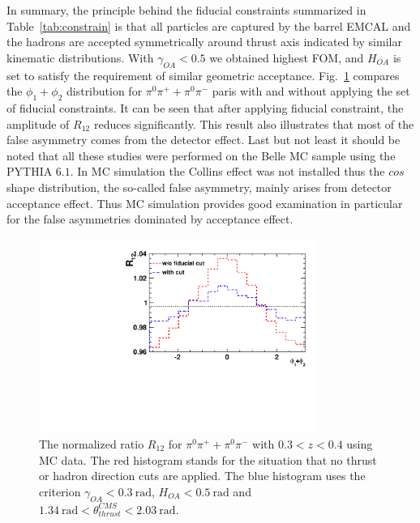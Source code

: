 In summary, the principle behind the fiducial constraints summarized in Table~\ref{tab:constrain} is that all particles are captured by the barrel EMCAL and the hadrons are accepted symmetrically around thrust axis indicated by similar kinematic distributions. With $\gamma_{OA}<0.5$ we obtained highest FOM, and $H_{OA}$ is set to satisfy the requirement of similar geometric acceptance. Fig.~\ref{fig:differentthetarange} compares the $\phi_1+\phi_2$ distribution for $\pi^0\pi^++\pi^0\pi^-$ paris with and without applying the set of fiducial constraints. It can be seen that after applying fiducial constraint, the amplitude of $R_{12}$ reduces significantly. This result also illustrates that  most of the false asymmetry comes from the detector effect. Last but not least it should be noted that all these studies were performed on the Belle MC sample using the PYTHIA $6.1$. In MC simulation the Collins effect was not installed thus the $cos$ shape distribution, the so-called false asymmetry, mainly arises from detector acceptance effect. Thus MC simulation provides good examination in particular for the false asymmetries dominated by acceptance effect.

\begin{figure}[h]
    \centering
    \includegraphics[width=0.8\textwidth,natwidth=610,natheight=642]{figure_dataselection/DetectorEffect.pdf}
    \caption{The normalized ratio $R_{12}$ for $\pi^0\pi^++\pi^0\pi^-$ with $0.3<z<0.4$ using MC data. The red histogram stands for the situation that no thrust or hadron direction cuts are applied. The blue histogram uses the criterion $\gamma_{OA} <0.3~\text{rad}$, $H_{OA}<0.5~\text{rad}$ and $1.34~\text{rad}<\theta^{CMS}_{thrust}<2.03~\text{rad}$.}
    \label{fig:differentthetarange}
\end{figure}

